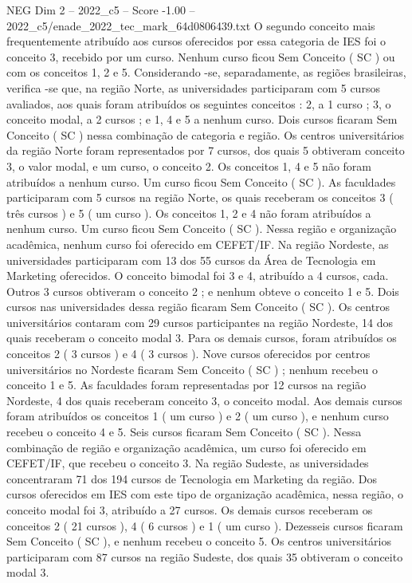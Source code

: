 \begin{textsample}{NEG Dim 2 – 2022\_c5 – Score -1.00 – 2022\_c5/enade\_2022\_tec\_mark\_64d0806439.txt}
O segundo conceito mais frequentemente atribuído aos cursos oferecidos por essa categoria de IES foi o conceito 3, recebido por um curso.
Nenhum curso ficou Sem Conceito ( SC ) ou com os conceitos 1, 2 e 5.
Considerando -se, separadamente, as regiões brasileiras, verifica -se que, na região Norte, as universidades participaram com 5 cursos avaliados, aos quais foram atribuídos os seguintes conceitos : 2, a 1 curso ; 3, o conceito modal, a 2 cursos ; e 1, 4 e 5 a nenhum curso.
Dois cursos ficaram Sem Conceito ( SC ) nessa combinação de categoria e região.
Os centros universitários da região Norte foram representados por 7 cursos, dos quais 5 obtiveram conceito 3, o valor modal, e um curso, o conceito 2.
Os conceitos 1, 4 e 5 não foram atribuídos a nenhum curso.
Um curso ficou Sem Conceito ( SC ).
As faculdades participaram com 5 cursos na região Norte, os quais receberam os conceitos 3 ( três cursos ) e 5 ( um curso ).
Os conceitos 1, 2 e 4 não foram atribuídos a nenhum curso.
Um curso ficou Sem Conceito ( SC ).
Nessa região e organização acadêmica, nenhum curso foi oferecido em CEFET/IF.
Na região Nordeste, as universidades participaram com 13 dos 55 cursos da Área de Tecnologia em Marketing oferecidos.
O conceito bimodal foi 3 e 4, atribuído a 4 cursos, cada.
Outros 3 cursos obtiveram o conceito 2 ; e nenhum obteve o conceito 1 e 5.
Dois cursos nas universidades dessa região ficaram Sem Conceito ( SC ).
Os centros universitários contaram com 29 cursos participantes na região Nordeste, 14 dos quais receberam o conceito modal 3.
Para os demais cursos, foram atribuídos os conceitos 2 ( 3 cursos ) e 4 ( 3 cursos ).
Nove cursos oferecidos por centros universitários no Nordeste ficaram Sem Conceito ( SC ) ; nenhum recebeu o conceito 1 e 5.
As faculdades foram representadas por 12 cursos na região Nordeste, 4 dos quais receberam conceito 3, o conceito modal.
Aos demais cursos foram atribuídos os conceitos 1 ( um curso ) e 2 ( um curso ), e nenhum curso recebeu o conceito 4 e 5.
Seis cursos ficaram Sem Conceito ( SC ).
Nessa combinação de região e organização acadêmica, um curso foi oferecido em CEFET/IF, que recebeu o conceito 3.
Na região Sudeste, as universidades concentraram 71 dos 194 cursos de Tecnologia em Marketing da região.
Dos cursos oferecidos em IES com este tipo de organização acadêmica, nessa região, o conceito modal foi 3, atribuído a 27 cursos.
Os demais cursos receberam os conceitos 2 ( 21 cursos ), 4 ( 6 cursos ) e 1 ( um curso ).
Dezesseis cursos ficaram Sem Conceito ( SC ), e nenhum recebeu o conceito 5.
Os centros universitários participaram com 87 cursos na região Sudeste, dos quais 35 obtiveram o conceito modal 3.

\end{textsample}
